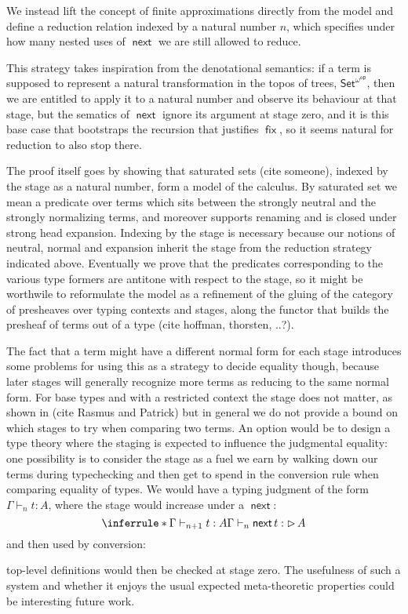 \documentclass{book}
\DeclareMathOperator{\fix}{\mathsf{fix}}
\DeclareMathOperator{\Later}{\vartriangleright}
\DeclareMathOperator{\next}{\ensuremath{\mathsf{next}}}
\begin{document}
  We instead lift the concept of finite approximations directly from
  the model and define a reduction relation indexed by a natural
  number $n$, which specifies under how many nested uses of $\next$ we
  are still allowed to reduce.
  
  This strategy takes inspiration from the denotational semantics: if
  a term is supposed to represent a natural transformation in the
  topos of trees, $\mathsf{Set}^{\omega^\mathsf{op}}$, then we are
  entitled to apply it to a natural number and observe its behaviour
  at that stage, but the sematics of $\next$ ignore its argument at
  stage zero, and it is this base case that bootstraps the recursion
  that justifies $\fix$, so it seems natural for reduction to also
  stop there.

  The proof itself goes by showing that saturated sets (cite someone),
  indexed by the stage as a natural number, form a model of the
  calculus. By saturated set we mean a predicate over terms which sits
  between the strongly neutral and the strongly normalizing terms, and
  moreover supports renaming and is closed under strong head
  expansion. Indexing by the stage is necessary because our notions
  of neutral, normal and expansion inherit the stage from the
  reduction strategy indicated above.
  Eventually we prove that the predicates corresponding to the various
  type formers are antitone with respect to the stage, so it might be
  worthwile to reformulate the model as a refinement of the gluing of
  the category of presheaves over typing contexts and stages, along the functor that
  builds the presheaf of terms out of a type (cite hoffman, thorsten, ..?).

  The fact that a term might have a different normal form for each
  stage introduces some problems for using this as a strategy to
  decide equality though, because later stages will generally
  recognize more terms as reducing to the same normal form.
  For base types and with a restricted context the stage does not
  matter, as shown in (cite Rasmus and Patrick) but in general we do
  not provide a bound on which stages to try when comparing two terms.
  An option would be to design a type theory where the staging is expected
  to influence the judgmental equality: one possibility is to consider
  the stage as a fuel we earn by walking down our terms during
  typechecking and then get to spend in the conversion rule when
  comparing equality of types.
  We would have a typing judgment of the form $\Gamma \vdash_n t : A$, where the stage would increase under a $\next$:
  \[
  \inferrule*{\Gamma \vdash_{n+1} t : A}
             {\Gamma \vdash_n \next t : \Later A}
  \]
  and then used by conversion:
  top-level definitions would then be checked at stage zero. The
  usefulness of such a system and whether it enjoys the usual expected
  meta-theoretic properties could be interesting future work.
\end{document}
